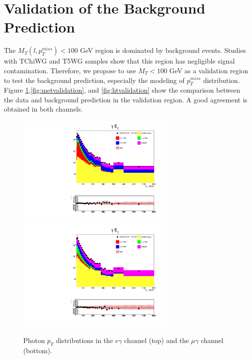 \documentclass[thesis.tex]{subfiles}
\renewcommand\_{\textunderscore\allowbreak}
\begin{document}
\section{Validation of the Background Prediction}

The $M_T(l, p_{T}^{miss}) < 100$ GeV region is dominated by background events. Studies with TChiWG and T5WG samples show that this region has negligible signal contamination. Therefore, we propose to use $M_T < 100$ GeV as a validation region to test the background prediction, especially the modeling of $p_T^{miss}$ distribution. Figure \ref{fig:etvalidation},\ref{fig:metvalidation}, and \ref{fig:htvalidation} show the comparison between the data and background prediction in the validation region. A good agreement is obtained in both channels.

\begin{figure}[hbtp]
  \centering
    \includegraphics[width=0.7\textwidth]{Figures/VALID_egamma_2016ReMiniAOD_pt.pdf} \\
    \includegraphics[width=0.7\textwidth]{Figures/VALID_mg_2016ReMiniAOD_pt.pdf} 
  \caption{Photon $p_T$ distributions in the $e\gamma$ channel (top) and the $\mu\gamma$ channel (bottom).}
    \label{fig:etvalidation}
\end{figure}
\end{document}
